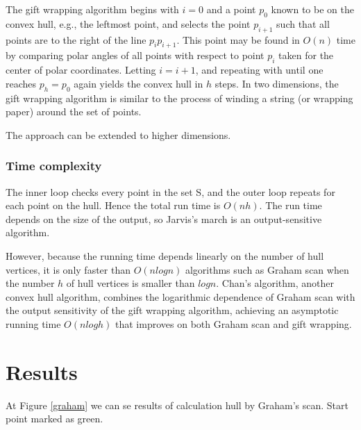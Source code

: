 \documentclass[a4paper,article,14pt]{extarticle}
\begin{document}
	The gift wrapping algorithm begins with $i=0$ and a point $p_0$ known to be on the convex hull, e.g., the leftmost point, and selects the point $p_{i+1}$ such that all points are to the right of the line $p_i p_{i+1}$. This point may be found in $O(n)$ time by comparing polar angles of all points with respect to point $p_i$ taken for the center of polar coordinates. Letting $i=i+1$, and repeating with until one reaches $p_h=p_0$ again yields the convex hull in $h$ steps. In two dimensions, the gift wrapping algorithm is similar to the process of winding a string (or wrapping paper) around the set of points.
	
	The approach can be extended to higher dimensions. 
	
	\subsubsection{Time complexity} 
	The inner loop checks every point in the set S, and the outer loop repeats for each point on the hull. Hence the total run time is $O(nh)$. The run time depends on the size of the output, so Jarvis's march is an output-sensitive algorithm.
	
	However, because the running time depends linearly on the number of hull vertices, it is only faster than $O(nlogn)$ algorithms such as Graham scan when the number $h$ of hull vertices is smaller than $logn$. Chan's algorithm, another convex hull algorithm, combines the logarithmic dependence of Graham scan with the output sensitivity of the gift wrapping algorithm, achieving an asymptotic running time $O(nlogh)$ that improves on both Graham scan and gift wrapping.

	
	\section{Results}
	
	At Figure \ref{graham} we can se results of calculation hull by Graham's scan. Start point marked as green.
	
\end{document}
